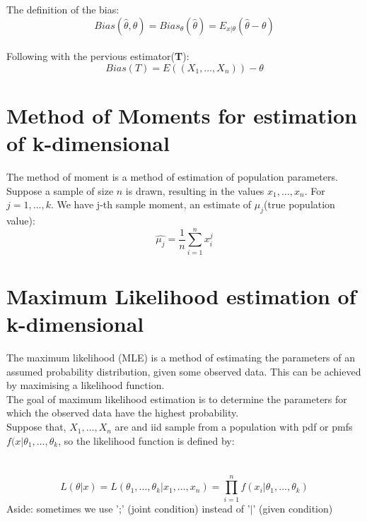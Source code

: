 \documentclass[12pt ]{article}
\begin{document}
\color{black}
The definition of the bias:
\begin{equation}
Bias(\hat{\theta}, \theta) = Bias_{\theta}(\hat{\theta}) = E_{x|\theta}(\hat{\theta} - \theta)
\end{equation}\\
Following with the pervious estimator(\textbf{T}):
\begin{equation*}
Bias(T) = E((X_{1}, \ldots, X_{n})) - \theta
\end{equation*}

\section{Method of Moments for estimation of k-dimensional}
The method of moment is a method of estimation of population parameters.\\

Suppose a sample of size $n$ is drawn, resulting in the values $x_{1}, \ldots, x_{n}$. For $j = 1, \ldots, k$. We have j-th sample moment, an estimate of $\mu_{j}$(true population value):
\begin{equation}
\hat{\mu_{j}} = \frac{1}{n} \sum_{i=1}^{n} x_{i}^{j}
\end{equation}


\section{Maximum Likelihood estimation of k-dimensional}
The maximum likelihood (MLE) is a method of estimating the parameters of an assumed probability distribution, given some observed data. This can be achieved by maximising a likelihood function. \\

The goal of maximum likelihood estimation is to determine the parameters for which the observed data have the highest probability.\\
Suppose that, $X_{1}, \ldots, X_{n}$ are and iid sample from a population with pdf or pmfs $f(x|\theta_{1}, \ldots, \theta_{k}$, so the likelihood function is defined by:\\
\\
\\
\begin{equation}
L(\theta|x) = L(\theta_{1}, \ldots, \theta_{k} | x_{1}, \ldots, x_{n}) = \prod_{i=1}^{n}f(x_{i}|\theta_{1}, \ldots, \theta_{k})
\end{equation}
\color{brown}
Aside: sometimes we use ';' (joint condition) instead of '$|$' (given condition)\\
\end{document}
